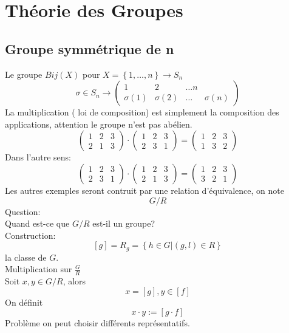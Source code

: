 \documentclass[../main.tex]{subfiles}
\begin{document}

\section{Théorie des Groupes}
\subsection{Groupe symmétrique de n}
Le groupe $Bij(X)$ pour $X= \left\{ 1,\ldots,n \right\} \to S_n$
\[ 
\sigma \in S_n \to
\begin{pmatrix}
	1 & 2 &\ldots n\\
	\sigma(1) & \sigma(2) &\ldots & \sigma(n)
\end{pmatrix}
\]
La multiplication ( loi de composition) est simplement la composition des applications, attention le groupe n'est pas abélien.
\[ 
\begin{pmatrix}
	1 &2 &3\\
	2 &1 &3
\end{pmatrix}
\cdot
\begin{pmatrix}
	1 & 2 &3\\
	2 &3 &1
\end{pmatrix}
= 
\begin{pmatrix}
	1 &2 &3\\
	1 & 3 &2
\end{pmatrix}
\]
Dans l'autre sens:
\[ 
\begin{pmatrix}
	1 & 2 &3\\
	2 &3 &1
\end{pmatrix}
\cdot
\begin{pmatrix}
	1 &2 &3\\
	2 &1 &3
\end{pmatrix}
= 
\begin{pmatrix}
	1 &2 &3\\
	3 &2 &1
\end{pmatrix}
\]
Les autres exemples seront contruit par une relation d'équivalence, on note
\[ 
G / R
\]
Question:\\
Quand est-ce que $G /R$ est-il un groupe?\\
Construction:\\
\[ 
	[ g]= R_g= \left\{ h \in G | ( g,l)\in R \right\} 
\]
la classe de $G$.\\
Multiplication sur $\frac{G}{R}$ \\
Soit $x,y \in G/R$, alors
\[ 
	x = [ g] ,y \in [ f]
\]
On définit
\[ 
x\cdot y := [ g\cdot f]
\]
Problème on peut choisir différents représentatifs.\\
\end{document}
